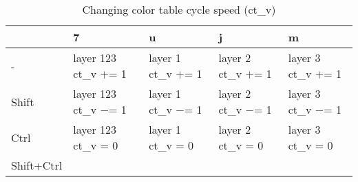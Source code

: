 \documentclass[10pt,a4paper]{article}
\begin{document}
\begin{table}[h!]
    \caption{Changing color table cycle speed (ct\_v)}
    \setlength{\tabcolsep}{0.0pt}
    \begin{tabularx}{\linewidth}{LLLLL}
        \toprule
                   & 7                      & u                    & j                    & m                    \\
        \midrule                                                                          
        -          & layer 123 ct\_v $+$= 1 & layer 1 ct\_v $+$= 1 & layer 2 ct\_v $+$= 1 & layer 3 ct\_v $+$= 1 \\
        Shift      & layer 123 ct\_v $-$= 1 & layer 1 ct\_v $-$= 1 & layer 2 ct\_v $-$= 1 & layer 3 ct\_v $-$= 1 \\
        Ctrl       & layer 123 ct\_v = 0    & layer 1 ct\_v = 0    & layer 2 ct\_v = 0    & layer 3 ct\_v = 0    \\
        Shift+Ctrl &                        &                      &                      &                      \\
        \bottomrule
    \end{tabularx}
\end{table}
\end{document}
